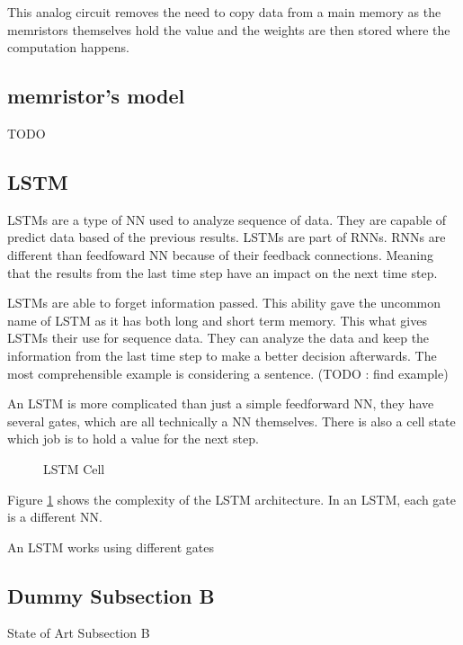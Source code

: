 This analog circuit removes the need to copy data from a main memory as the memristors themselves hold the value and the weights are then stored where the computation happens.

\subsection{memristor's model}
TODO
\subsection{LSTM}
\acp{LSTM} are a type of \ac{NN} used to analyze sequence of data. They are capable of predict data based of the previous results. \acp{LSTM} are part of \acp{RNN}. \acp{RNN} are different than feedfoward \acl{NN} because of their feedback connections. Meaning that the results from the last time step have an impact on the next time step.

\acp{LSTM} are able to forget information passed. This ability gave the uncommon name of \acl{LSTM} as it has both long and short term memory. This what gives \acp{LSTM} their use for sequence data. They can analyze the data and keep the information from the last time step to make a better decision afterwards. The most comprehensible example is considering a sentence. (TODO : find example)

An \ac{LSTM} is more complicated than just a simple feedforward \acl{NN}, they have several gates, which are all technically a \ac{NN} themselves. There is also a cell state which job is to hold a value for the next step.

\begin{figure}[H]
  \centering
  
  \caption{LSTM Cell}
  \label{fig:lstmCell}
\end{figure}

Figure \ref{fig:lstmCell} shows the complexity of the \ac{LSTM} architecture. In an \ac{LSTM}, each gate is a different \ac{NN}.

An \ac{LSTM} works using different gates
\subsection{Dummy Subsection B}
\label{subsec:subsectionb}

State of Art Subsection B


